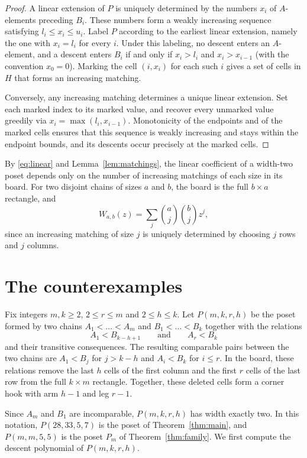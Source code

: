 \documentclass[11pt]{amsart}
\theoremstyle{remark}
\numberwithin{equation}{section}
\begin{document}
\begin{proof}
A linear extension of $P$ is uniquely determined by the numbers $x_i$ of
$A$-elements preceding $B_i$. These numbers form a weakly increasing sequence
satisfying $l_i\le x_i\le u_i$. Label $P$ according to the earliest linear
extension, namely the one with $x_i=l_i$ for every $i$. Under this labeling, no
descent enters an $A$-element, and a descent enters $B_i$ if and only if
$x_i>l_i$ and $x_i>x_{i-1}$ (with the convention $x_0=0$). Marking the cell
$(i,x_i)$ for each such $i$ gives a set of cells in $H$ that forms an
increasing matching.

Conversely, any increasing matching determines a unique linear extension. Set
each marked index to its marked value, and recover every unmarked value greedily
via $x_i=\max(l_i,x_{i-1})$. Monotonicity of the endpoints and of the marked
cells ensures that this sequence is weakly increasing and stays within the
endpoint bounds, and its descents occur precisely at the marked cells.
\end{proof}

By \eqref{eq:linear} and Lemma~\ref{lem:matchings}, the linear coefficient of a
width-two poset depends only on the number of increasing matchings of each size
in its board. For two disjoint chains of sizes $a$ and $b$, the board is the
full $b\times a$ rectangle, and
\[
 W_{a,b}(z)=\sum_j\binom aj\binom bjz^j,
\]
since an increasing matching of size $j$ is uniquely determined by choosing $j$
rows and $j$ columns.

\section{The counterexamples}\label{sec:counterexample}

Fix integers $m,k\ge2$, $2\le r\le m$ and $2\le h\le k$. Let $P(m,k,r,h)$ be the
poset formed by two chains $A_1<\dots<A_m$ and $B_1<\dots<B_k$ together with the
relations
\[
 A_1<B_{k-h+1}\qquad\text{and}\qquad A_r<B_k
\]
and their transitive consequences. The resulting comparable pairs between the
two chains are $A_1<B_j$ for $j>k-h$ and $A_i<B_k$ for $i\le r$. In the board,
these relations remove the last $h$ cells of the first column and the first $r$
cells of the last row from the full $k\times m$ rectangle. Together, these
deleted cells form a corner hook with arm $h-1$ and leg $r-1$.

Since $A_m$ and $B_1$ are incomparable, $P(m,k,r,h)$ has width exactly two. In
this notation, $P(28,33,5,7)$ is the poset of Theorem~\ref{thm:main}, and
$P(m,m,5,5)$ is the poset $P_m$ of Theorem~\ref{thm:family}. We first compute
the descent polynomial of $P(m,k,r,h)$.
\end{document}

